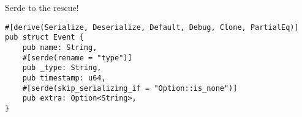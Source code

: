 \begin{frame}[c,fragile]{Serde to the rescue!}
    \begin{verbatim}
#[derive(Serialize, Deserialize, Default, Debug, Clone, PartialEq)]
pub struct Event {
    pub name: String,
    #[serde(rename = "type")]
    pub _type: String,
    pub timestamp: u64,
    #[serde(skip_serializing_if = "Option::is_none")]
    pub extra: Option<String>,
}
    \end{verbatim}
\end{frame}

